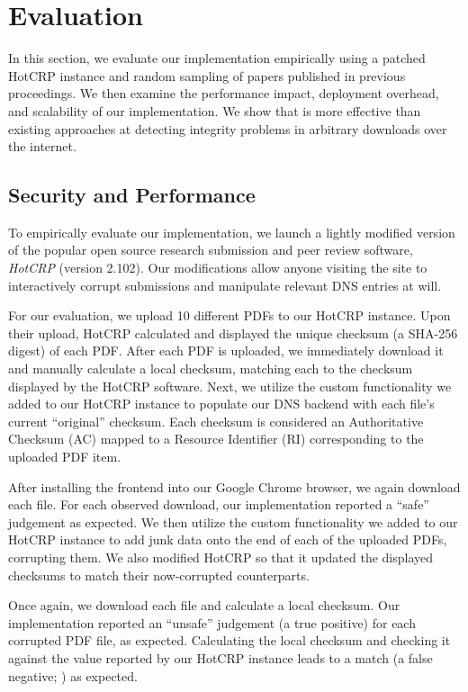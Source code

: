 \section{Evaluation} \label{sec:evaluation}

In this section, we evaluate our implementation empirically using a patched
HotCRP instance and random sampling of papers published in previous
\CONFERENCE{} proceedings. We then examine the performance impact, deployment
overhead, and scalability of our implementation. We show that \SYSTEM{} is more
effective than existing approaches at detecting integrity problems in arbitrary
downloads over the internet.

\subsection{Security and Performance}


To empirically evaluate our implementation, we launch a lightly modified version
of the popular open source research submission and peer review software,
\emph{HotCRP} (version 2.102). Our modifications allow anyone visiting the site
to interactively corrupt submissions and manipulate relevant DNS entries at
will.

For our evaluation, we upload 10 different \CONFERENCE{} PDFs to our HotCRP
instance. Upon their upload, HotCRP calculated and displayed the unique checksum
(a SHA-256 digest) of each PDF. After each PDF is uploaded, we immediately
download it and manually calculate a local checksum, matching each to the
checksum displayed by the HotCRP software. Next, we utilize the custom
functionality we added to our HotCRP instance to populate our DNS backend with
each file's current ``original'' checksum. Each checksum is considered an
Authoritative Checksum (AC) mapped to a Resource Identifier (RI) corresponding
to the uploaded PDF item.

After installing the frontend into our Google Chrome browser, we again download
each file. For each observed download, our implementation reported a ``safe''
judgement as expected. We then utilize the custom functionality we added to our
HotCRP instance to add junk data onto the end of each of the uploaded PDFs,
corrupting them. We also modified HotCRP so that it updated the displayed
checksums to match their now-corrupted counterparts.

Once again, we download each file and calculate a local checksum. Our
implementation reported an ``unsafe'' judgement (a true positive) for each
corrupted PDF file, as expected. Calculating the local checksum and checking it
against the value reported by our HotCRP instance leads to a match (a false
negative; ) as expected.

